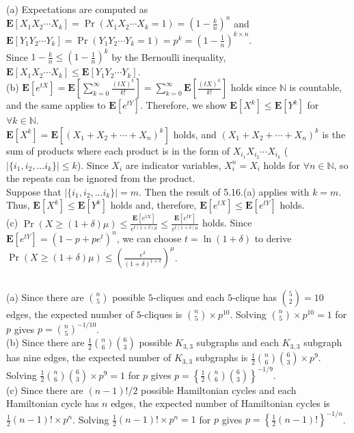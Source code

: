 \documentclass{article}
\begin{document}
\subsection{}
(a) Expectations are computed as $\textbf{E}[X_1X_2\cdots X_k]=\Pr(X_1X_2\cdots X_k=1)=(1-\frac{k}{n})^n$ 
and $\textbf{E}[Y_1Y_2\cdots Y_k]=\Pr(Y_1Y_2\cdots Y_k=1)=p^k=(1-\frac{1}{n})^{k\times n}$.\\
Since $1-\frac{k}{n}\leq (1-\frac{1}{n})^k$ by the Bernoulli inequality, $\textbf{E}[X_1X_2\cdots X_k]\leq \textbf{E}[Y_1Y_2\cdots Y_k]$.\\
(b) $\textbf{E}[e^{tX}]=\textbf{E}\left[\sum\limits_{k=0}^\infty\frac{(tX)^k}{k!}\right]=\sum\limits_{k=0}^\infty\textbf{E}[\frac{(tX)^k}{k!}]$
holds since $\mathbb{N}$ is countable, and the same applies to $\textbf{E}[e^{tY}]$.
Therefore, we show $\textbf{E}[X^k]\leq\textbf{E}[Y^k]$ for $\forall k\in \mathbb{N}$.\\
$\textbf{E}[X^k]=\textbf{E}[(X_1+X_2+\cdots+X_n)^k]$ holds, and $(X_1+X_2+\cdots+X_n)^k$ is the sum of products where each product is in the form of $X_{i_1}X_{i_2}\cdots X_{i_k}$ ($|\{i_1,i_2,...i_k\}|\leq k$).
Since $X_i$ are indicator variables, $X_i^n=X_i$ holds for $\forall n \in \mathbb{N}$, so the repeats can be ignored from the product.\\
Suppose that $|\{i_1,i_2,...i_k\}|=m$. Then the result of 5.16.(a) applies with $k=m$. Thus, $\textbf{E}[X^k]\leq\textbf{E}[Y^k]$ holds and, therefore, $\textbf{E}[e^{tX}]\leq\textbf{E}[e^{tY}]$ holds.\\
(c) $\Pr(X\geq(1+\delta)\mu)\leq\frac{\textbf{E}[e^{tX}]}{e^{t(1+\delta)\mu}}\leq\frac{\textbf{E}[e^{tY}]}{e^{t(1+\delta)\mu}}$ holds. 
Since $\textbf{E}[e^{tY}]=(1-p+pe^t)^n$, we can choose $t=\ln(1+\delta)$ to derive $\Pr(X\geq(1+\delta)\mu)\leq\left(\frac{e^\delta}{(1+\delta)^{1+\delta}}\right)^\mu$.
\subsection{}
(a) Since there are $\binom{n}{5}$ possible $5$-cliques and each $5$-clique has $\binom{5}{2}=10$ edges, the expected number of $5$-cliques is $\binom{n}{5}\times p^{10}$.
Solving $\binom{n}{5}\times p^{10}=1$ for $p$ gives $p=\binom{n}{5}^{-1/10}$.\\
(b) Since there are $\frac{1}{2}\binom{n}{6}\binom{6}{3}$ possible $K_{3,3}$ subgraphs and each $K_{3,3}$ subgraph has nine edges,
the expected number of $K_{3,3}$ subgraphs is $\frac{1}{2}\binom{n}{6}\binom{6}{3}\times p^9$.
Solving $\frac{1}{2}\binom{n}{6}\binom{6}{3}\times p^9=1$ for $p$ gives $p=\left\{\frac{1}{2}\binom{n}{6}\binom{6}{3}\right\}^{-1/9}$.\\
(c) Since there are $(n-1)!/2$ possible Hamiltonian cycles and each Hamiltonian cycle has $n$ edges,
the expected number of Hamiltonian cycles is $\frac{1}{2}(n-1)!\times p^n$.
Solving $\frac{1}{2}(n-1)!\times p^n=1$ for $p$ gives $p=\left\{\frac{1}{2}(n-1)!\right\}^{-1/n}$.
\end{document}
